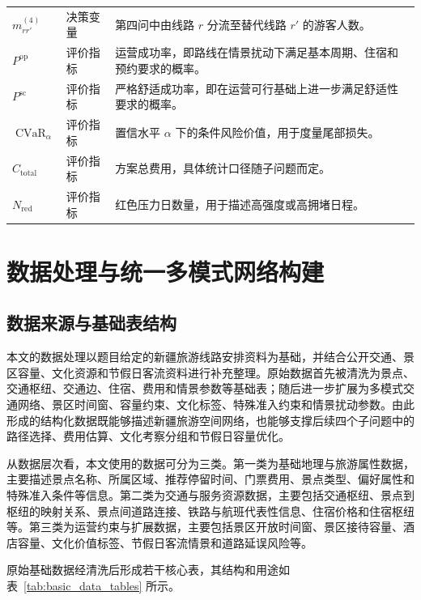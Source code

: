 \documentclass[UTF8,zihao=-4,a4paper]{ctexart}
\begin{document}
\begin{table}[htbp]
\begin{tabularx}{\textwidth}{L{3.2cm} L{3.0cm} Y}
        $m_{r r'}^{(4)}$ & 决策变量 & 第四问中由线路 $r$ 分流至替代线路 $r'$ 的游客人数。 \\
        $P^{\mathrm{op}}$ & 评价指标 & 运营成功率，即路线在情景扰动下满足基本周期、住宿和预约要求的概率。 \\
        $P^{\mathrm{sc}}$ & 评价指标 & 严格舒适成功率，即在运营可行基础上进一步满足舒适性要求的概率。 \\
        $\operatorname{CVaR}_{\alpha}$ & 评价指标 & 置信水平 $\alpha$ 下的条件风险价值，用于度量尾部损失。 \\
        $C_{\mathrm{total}}$ & 评价指标 & 方案总费用，具体统计口径随子问题而定。 \\
        $N_{\mathrm{red}}$ & 评价指标 & 红色压力日数量，用于描述高强度或高拥堵日程。 \\
        \bottomrule
    \end{tabularx}
\end{table}

\section{数据处理与统一多模式网络构建}
\label{sec:data_network}

\subsection{数据来源与基础表结构}
\label{subsec:data_sources}

本文的数据处理以题目给定的新疆旅游线路安排资料为基础，并结合公开交通、景区容量、文化资源和节假日客流资料进行补充整理。原始数据首先被清洗为景点、交通枢纽、交通边、住宿、费用和情景参数等基础表；随后进一步扩展为多模式交通网络、景区时间窗、容量约束、文化标签、特殊准入约束和情景扰动参数。由此形成的结构化数据既能够描述新疆旅游空间网络，也能够支撑后续四个子问题中的路径选择、费用估算、文化考察分组和节假日容量优化。

从数据层次看，本文使用的数据可分为三类。第一类为基础地理与旅游属性数据，主要描述景点名称、所属区域、推荐停留时间、门票费用、景点类型、偏好属性和特殊准入条件等信息。第二类为交通与服务资源数据，主要包括交通枢纽、景点到枢纽的映射关系、景点间道路连接、铁路与航班代表性信息、住宿价格和住宿枢纽等。第三类为运营约束与扩展数据，主要包括景区开放时间窗、景区接待容量、酒店容量、文化价值标签、节假日客流情景和道路延误风险等。

原始基础数据经清洗后形成若干核心表，其结构和用途如表~\ref{tab:basic_data_tables} 所示。
\end{document}

